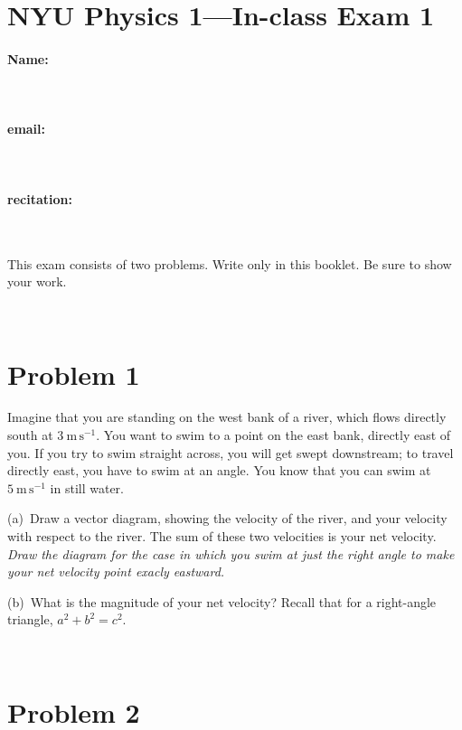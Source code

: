\documentclass[12pt]{article}
\begin{document}
\section*{NYU Physics 1---In-class Exam 1}

\vfill

\paragraph{Name:} ~

\paragraph{email:} ~

\paragraph{recitation:} ~

\vfill

This exam consists of two problems.  Write only in this booklet.  Be
sure to show your work.

\vfill ~

\clearpage

\section*{Problem 1}

Imagine that you are standing on the west bank of a river, which flows
directly south at $3~\mathrm{m\,s^{-1}}$.  You want to swim to a point
on the east bank, directly east of you.  If you try to swim straight
across, you will get swept downstream; to travel directly east, you
have to swim at an angle.  You know that you can swim at
$5~\mathrm{m\,s^{-1}}$ in still water.

\noindent
(a)~Draw a vector diagram, showing the velocity of the river, and your
velocity with respect to the river.  The sum of these two velocities
is your net velocity.  \emph{Draw the diagram for the case in which
you swim at just the right angle to make your net velocity point
exacly eastward.}

\vfill

\noindent
(b)~What is the magnitude of your net velocity?  Recall that for a
right-angle triangle, $a^2+b^2=c^2$.

\vfill ~

\clearpage

\section*{Problem 2}
\end{document}
